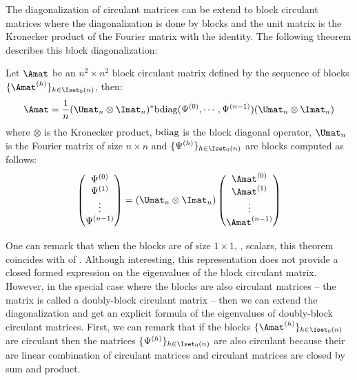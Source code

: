 \noindent
The diagonalization of circulant matrices can be extend to block circulant matrices where the diagonalization is done by blocks and the unit matrix is the Kronecker product of the Fourier matrix with the identity.
The following theorem describes this block diagonalization:
\begin{theorem}
  Let $\Amat$ be an $n^2 \times n^2$ block circulant matrix defined by the sequence of blocks $\{\Amat^{(h)}\}_{h \in \Iset_0(n)}$, then:
  \begin{equation} \label{equation:ch2-block_diagonalization_block_circulant}
    \Amat = \frac{1}{n} (\Umat_n \otimes \Imat_n)^* \bdiag(\Psi^{(0)}, \cdots, \Psi^{(n-1)}) (\Umat_n \otimes \Imat_n)
  \end{equation}
  where $\otimes$ is the Kronecker product, $\mathrm{bdiag}$ is the block diagonal operator, $\Umat_n$ is the Fourier matrix of size $n \times n$ and $\{\Psi^{(h)}\}_{h \in \Iset_0(n)}$ are blocks computed as follows:
  \begin{equation}
    \leftmatrix
      \Psi^{(0)} \\
      \Psi^{(1)} \\
      \vdots \\
      \Psi^{(n-1)} \\
    \rightmatrix = 
    (\Umat_n \otimes \Imat_n)
    \leftmatrix
      \Amat^{(0)} \\
      \Amat^{(1)} \\
      \vdots \\
      \Amat^{(n-1)} \\
    \rightmatrix
  \end{equation}
  \removespace
\end{theorem}
\noindent
One can remark that when the blocks are of size $1 \times 1$, \ie, scalars, this theorem coincides with  of .
Although interesting, this representation does not provide a closed formed expression on the eigenvalues of the block circulant matrix.
However, in the special case where the blocks are also circulant matrices -- the matrix is called a doubly-block circulant matrix -- then we can extend the diagonalization and get an explicit formula of the eigenvalues of doubly-block circulant matrices.
First, we can remark that if the blocks $\{\Amat^{(h)}\}_{h \in \Iset_0(n)}$ are circulant then the matrices $\{\Psi^{(h)}\}_{h \in \Iset_0(n)}$ are also circulant because their are linear combination of circulant matrices and circulant matrices are closed by sum and product. 
